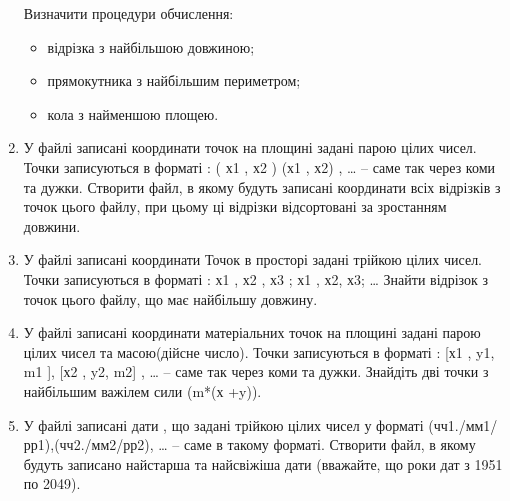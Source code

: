 \documentclass[a5paper,titlepage,openany,twoside,draft]{book_unv}%
\begin{document}
\begin{enumerate}
Визначити процедури обчислення:
\begin{itemize}
\item відрізка з найбільшою довжиною;
\item прямокутника з найбільшим периметром;
\item кола з найменшою площею.
\end{itemize}


\item 
У файлі записані координати точок на площині задані парою цілих
чисел. Точки записуються в форматі : ( х1 , х2 ) (х1 , х2) , \ldots{} --
саме так через коми та дужки. Створити файл, в якому будуть записані
координати всіх відрізків з точок цього файлу, при цьому ці відрізки
відсортовані за зростанням довжини.

\item 
У файлі записані координати Точок в просторі задані трійкою цілих
чисел. Точки записуються в форматі : х1 , х2 , х3 ; х1 , х2, х3;
\ldots{} Знайти відрізок з точок цього файлу, що має найбільшу довжину.

\item 
У файлі записані координати матеріальних точок на площині задані
парою цілих чисел та масою(дійсне число). Точки записуються в форматі :
{[}х1 , y1, m1 {]}, {[}х2 , y2, m2{]} , \ldots{}  -- саме так
через коми та дужки. Знайдіть дві точки з найбільшим важілем сили (m*(х
+y)).

\item 
У файлі записані дати , що задані трійкою цілих чисел у форматі
(чч1./мм1/рр1),(чч2./мм2/рр2), \ldots{} -- саме в такому форматі.
Створити файл, в якому будуть записано найстарша та найсвіжіша дати
(вважайте, що роки дат з 1951 по 2049).

\end{enumerate}
\end{document}
